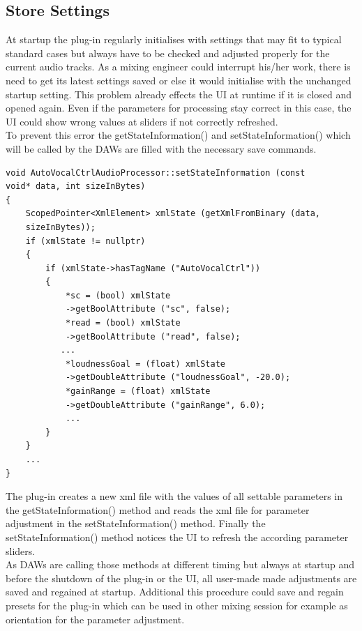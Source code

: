 \subsection{Store Settings}

At startup the plug-in regularly initialises with settings that may fit to typical standard cases but always have to be checked and adjusted properly for the current audio tracks. As a mixing engineer could interrupt his/her work, there is need to get its latest settings saved or else it would initialise with the unchanged startup setting. This problem already effects the UI at runtime if it is closed and opened again. Even if the parameters for processing stay correct in this case, the UI could show wrong values at sliders if not correctly refreshed.\\
To prevent this error the getStateInformation() and setStateInformation() which will be called by the DAWs are filled with the necessary save commands.\\

\begin{lstlisting}[frame=single]
void AutoVocalCtrlAudioProcessor::setStateInformation (const 
void* data, int sizeInBytes)
{
    ScopedPointer<XmlElement> xmlState (getXmlFromBinary (data, 
    sizeInBytes));
    if (xmlState != nullptr)
    {
        if (xmlState->hasTagName ("AutoVocalCtrl"))
        {
            *sc = (bool) xmlState
            ->getBoolAttribute ("sc", false);
            *read = (bool) xmlState
            ->getBoolAttribute ("read", false);
           ...
            *loudnessGoal = (float) xmlState
            ->getDoubleAttribute ("loudnessGoal", -20.0);
            *gainRange = (float) xmlState
            ->getDoubleAttribute ("gainRange", 6.0);
            ...
        }
    }
    ...
}
\end{lstlisting}

The plug-in creates a new xml file with the values of all settable parameters in the getStateInformation() method and reads the xml file for parameter adjustment in the setStateInformation() method. Finally the setStateInformation() method notices the UI to refresh the according parameter sliders.\\
As DAWs are calling those methods at different timing but always at startup and before the shutdown of the plug-in or the UI, all user-made made adjustments are saved and regained at startup. Additional this procedure could save and regain presets for the plug-in which can be used in other mixing session for example as orientation for the parameter adjustment.\\

